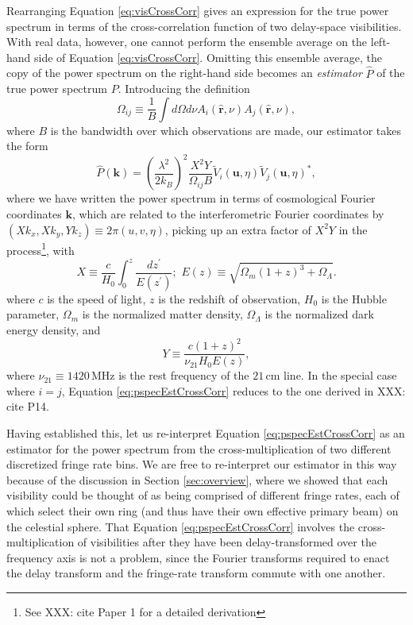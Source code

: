 \documentclass[twocolumn,apj,numberedappendix]{emulateapj}
\newcommand{\rhat}{\hat{\mathbf{r}}}
\begin{document}
Rearranging Equation \eqref{eq:visCrossCorr} gives an expression for the true power spectrum in terms of the cross-correlation function of two delay-space visibilities. With real data, however, one cannot perform the ensemble average on the left-hand side of Equation \eqref{eq:visCrossCorr}. Omitting this ensemble average, the copy of the power spectrum on the right-hand side becomes an \emph{estimator} $\widehat{P}$ of the true power spectrum $P$. Introducing the definition
\begin{equation}
\label{eq:Omega_ij_def}
\Omega_{ij} \equiv \frac{1}{B} \int d\Omega d\nu A_i (\rhat,\nu) A_j (\rhat,\nu),
\end{equation}
where $B$ is the bandwidth over which observations are made, our estimator takes the form
\begin{equation}
\label{eq:pspecEstCrossCorr}
\widehat{P} (\mathbf{k}) = \left( \frac{\lambda^2}{2 k_B} \right)^2 \frac{X^2 Y}{\Omega_{ij} B} \widetilde{V}_i(\mathbf{u},\eta) \widetilde{V}_j(\mathbf{u},\eta)^*,
\end{equation}
where we have written the power spectrum in terms of cosmological Fourier coordinates $\mathbf{k}$, which are related to the interferometric Fourier coordinates by $(X k_x, X k_y, Y k_z) \equiv 2 \pi (u , v, \eta)$, picking up an extra factor of $X^2 Y$ in the process\footnote{See XXX: cite Paper 1 for a detailed derivation}, with
\begin{equation}
X \equiv \frac{c}{H_0} \int_0^z \frac{dz^\prime}{E(z^\prime)}; \,\, E(z) \equiv \sqrt{\Omega_m (1+z)^3 + \Omega_\Lambda}.
\end{equation}
where $c$ is the speed of light, $z$ is the redshift of observation, $H_0$ is the Hubble parameter, $\Omega_m$ is the normalized matter density, $\Omega_\Lambda$ is the normalized dark energy density, and
\begin{equation}
Y \equiv  \frac{c(1+z)^2}{\nu_{21} H_0 E(z)},
\end{equation}
where $\nu_{21} \equiv 1420\,\textrm{MHz}$ is the rest frequency of the $21\,\textrm{cm}$ line. In the special case where $i=j$, Equation \eqref{eq:pspecEstCrossCorr} reduces to the one derived in XXX: cite P14.

Having established this, let us re-interpret Equation \eqref{eq:pspecEstCrossCorr} as an estimator for the power spectrum from the cross-multiplication of two different discretized fringe rate bins. We are free to re-interpret our estimator in this way because of the discussion in Section \ref{sec:overview}, where we showed that each visibility could be thought of as being comprised of different fringe rates, each of which select their own ring (and thus have their own effective primary beam) on the celestial sphere. That Equation \eqref{eq:pspecEstCrossCorr} involves the cross-multiplication of visibilities after they have been delay-transformed over the frequency axis is not a problem, since the Fourier transforms required to enact the delay transform and the fringe-rate transform commute with one another.
\end{document}
